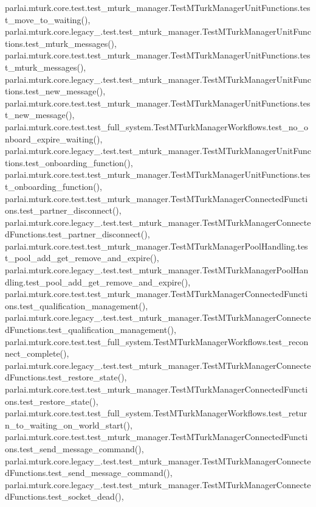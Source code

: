 parlai.\+mturk.\+core.\+test.\+test\+\_\+mturk\+\_\+manager.\+Test\+M\+Turk\+Manager\+Unit\+Functions.\+test\+\_\+move\+\_\+to\+\_\+waiting(), parlai.\+mturk.\+core.\+legacy\+\_.\+test.\+test\+\_\+mturk\+\_\+manager.\+Test\+M\+Turk\+Manager\+Unit\+Functions.\+test\+\_\+mturk\+\_\+messages(), parlai.\+mturk.\+core.\+test.\+test\+\_\+mturk\+\_\+manager.\+Test\+M\+Turk\+Manager\+Unit\+Functions.\+test\+\_\+mturk\+\_\+messages(), parlai.\+mturk.\+core.\+legacy\+\_.\+test.\+test\+\_\+mturk\+\_\+manager.\+Test\+M\+Turk\+Manager\+Unit\+Functions.\+test\+\_\+new\+\_\+message(), parlai.\+mturk.\+core.\+test.\+test\+\_\+mturk\+\_\+manager.\+Test\+M\+Turk\+Manager\+Unit\+Functions.\+test\+\_\+new\+\_\+message(), parlai.\+mturk.\+core.\+test.\+test\+\_\+full\+\_\+system.\+Test\+M\+Turk\+Manager\+Workflows.\+test\+\_\+no\+\_\+onboard\+\_\+expire\+\_\+waiting(), parlai.\+mturk.\+core.\+legacy\+\_.\+test.\+test\+\_\+mturk\+\_\+manager.\+Test\+M\+Turk\+Manager\+Unit\+Functions.\+test\+\_\+onboarding\+\_\+function(), parlai.\+mturk.\+core.\+test.\+test\+\_\+mturk\+\_\+manager.\+Test\+M\+Turk\+Manager\+Unit\+Functions.\+test\+\_\+onboarding\+\_\+function(), parlai.\+mturk.\+core.\+test.\+test\+\_\+mturk\+\_\+manager.\+Test\+M\+Turk\+Manager\+Connected\+Functions.\+test\+\_\+partner\+\_\+disconnect(), parlai.\+mturk.\+core.\+legacy\+\_.\+test.\+test\+\_\+mturk\+\_\+manager.\+Test\+M\+Turk\+Manager\+Connected\+Functions.\+test\+\_\+partner\+\_\+disconnect(), parlai.\+mturk.\+core.\+test.\+test\+\_\+mturk\+\_\+manager.\+Test\+M\+Turk\+Manager\+Pool\+Handling.\+test\+\_\+pool\+\_\+add\+\_\+get\+\_\+remove\+\_\+and\+\_\+expire(), parlai.\+mturk.\+core.\+legacy\+\_.\+test.\+test\+\_\+mturk\+\_\+manager.\+Test\+M\+Turk\+Manager\+Pool\+Handling.\+test\+\_\+pool\+\_\+add\+\_\+get\+\_\+remove\+\_\+and\+\_\+expire(), parlai.\+mturk.\+core.\+test.\+test\+\_\+mturk\+\_\+manager.\+Test\+M\+Turk\+Manager\+Connected\+Functions.\+test\+\_\+qualification\+\_\+management(), parlai.\+mturk.\+core.\+legacy\+\_.\+test.\+test\+\_\+mturk\+\_\+manager.\+Test\+M\+Turk\+Manager\+Connected\+Functions.\+test\+\_\+qualification\+\_\+management(), parlai.\+mturk.\+core.\+test.\+test\+\_\+full\+\_\+system.\+Test\+M\+Turk\+Manager\+Workflows.\+test\+\_\+reconnect\+\_\+complete(), parlai.\+mturk.\+core.\+legacy\+\_.\+test.\+test\+\_\+mturk\+\_\+manager.\+Test\+M\+Turk\+Manager\+Connected\+Functions.\+test\+\_\+restore\+\_\+state(), parlai.\+mturk.\+core.\+test.\+test\+\_\+mturk\+\_\+manager.\+Test\+M\+Turk\+Manager\+Connected\+Functions.\+test\+\_\+restore\+\_\+state(), parlai.\+mturk.\+core.\+test.\+test\+\_\+full\+\_\+system.\+Test\+M\+Turk\+Manager\+Workflows.\+test\+\_\+return\+\_\+to\+\_\+waiting\+\_\+on\+\_\+world\+\_\+start(), parlai.\+mturk.\+core.\+test.\+test\+\_\+mturk\+\_\+manager.\+Test\+M\+Turk\+Manager\+Connected\+Functions.\+test\+\_\+send\+\_\+message\+\_\+command(), parlai.\+mturk.\+core.\+legacy\+\_.\+test.\+test\+\_\+mturk\+\_\+manager.\+Test\+M\+Turk\+Manager\+Connected\+Functions.\+test\+\_\+send\+\_\+message\+\_\+command(), parlai.\+mturk.\+core.\+legacy\+\_.\+test.\+test\+\_\+mturk\+\_\+manager.\+Test\+M\+Turk\+Manager\+Connected\+Functions.\+test\+\_\+socket\+\_\+dead(), 